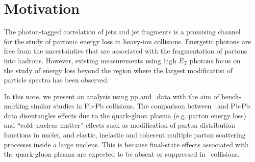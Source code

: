\section{Motivation}
\label{sec:motivation}
The photon-tagged correlation of jets and jet fragments is a promising channel for the study of partonic energy loss in heavy-ion collisions. Energetic photons are free from the uncertainties that are associated with the fragmentation of partons into hadrons. However, existing measurements using high $E_{\mathrm{T}}$ photons focus on the study of energy loss beyond the region where the largest modification of particle spectra has been observed.

In this note, we present an analysis using pp and \pPb~data with the aim of bench-marking similar studies in Pb-Pb collisions. The comparison between \pPb~and Pb-Pb data disentangles effects due to the quark-gluon plasma (e.g. parton energy loss) and ``cold--nuclear matter'' effects such as modification of parton distribution functions in nuclei, and elastic, inelastic and coherent multiple parton scattering processes inside a large nucleus. This is because final-state effects associated with the quark-gluon plasma are expected to be absent or suppressed in \pPb~collisions.  




